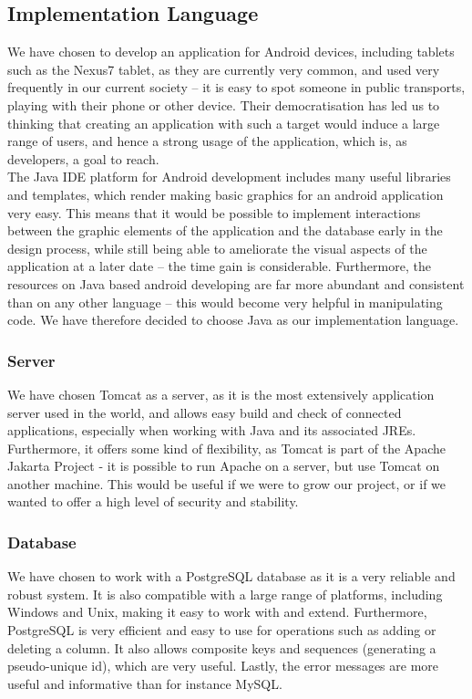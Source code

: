 \documentclass[a4paper,11pt]{article}
\begin{document}
\subsection*{Implementation Language}
We have chosen to develop an application for Android devices, including tablets such as the Nexus7 tablet, as they are currently very common, and used very frequently in our current society – it is easy to spot someone in public transports, playing with their phone or other device. Their democratisation has led us to thinking that creating an application with such a target would induce a large range of users, and hence a strong usage of the application, which is, as developers, a goal to reach. \\
The Java IDE platform for Android development includes many useful libraries and templates, which render making basic graphics for an android application very easy. This means that it would be possible to implement interactions between the graphic elements of the application and the database early in the design process, while still being able to ameliorate the visual aspects of the application at a later date – the time gain is considerable. Furthermore, the resources on Java based android developing are far more abundant and consistent than on any other language – this would become very helpful in manipulating code. We have therefore decided to choose Java as our implementation language.\\

\subsubsection*{Server}
We have chosen Tomcat as a server, as it is the most extensively application server used in the world, and allows easy build and check of connected applications, especially when working with Java and its associated JREs. Furthermore, it offers some kind of flexibility, as Tomcat is part of the Apache Jakarta Project - it is possible to run Apache on a server, but use Tomcat on another machine. This would be useful if we were to grow our project, or if we wanted to offer a high level of security and stability.

\subsubsection*{Database}
We have chosen to work with a PostgreSQL database as it is a very reliable and robust system. It is also compatible with a large range of platforms, including Windows and Unix, making it easy to work with and extend. Furthermore, PostgreSQL is very efficient and easy to use for operations such as adding or deleting a column. It also allows composite keys and sequences (generating a pseudo-unique id), which are very useful. Lastly, the error messages are more useful and informative than for instance MySQL.
\end{document}
